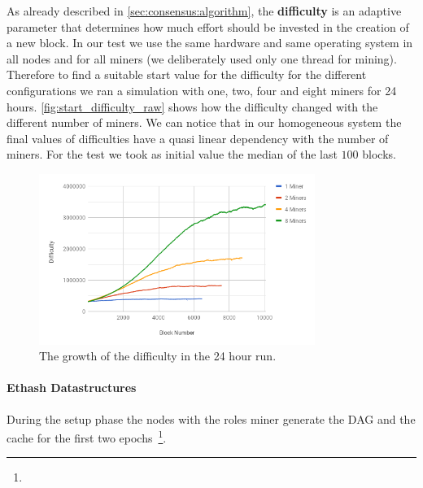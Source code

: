 As already described in \autoref{sec:consensus:algorithm}, the
\textbf{difficulty} is an adaptive parameter  that determines how much effort
should be invested in the creation of a new block. In our test we use the same
hardware and same operating system in all nodes and for all miners (we
deliberately used only one thread for mining). Therefore to find a suitable
start value for the difficulty for the different configurations we ran a
simulation with one, two, four and eight miners for 24 hours.
\autoref{fig:start_difficulty_raw} shows how the difficulty changed with the
different number of miners. We can notice that in our homogeneous system the
final values of difficulties have a quasi linear dependency with the number of
miners. For the test we took as initial value the median of the last $100$
blocks.
\begin{figure}
    \begin{center}
        \includegraphics[width=0.8\textwidth]{./res/img/start_difficulty_all.png}
        \caption{The growth of the difficulty in the 24 hour run.}
        \label{fig:start_difficulty_raw}
    \end{center}
\end{figure}

\paragraph{Ethash Datastructures}
During the setup phase the nodes with the roles miner generate the
DAG and the cache for the first two epochs~\footnote{}.






